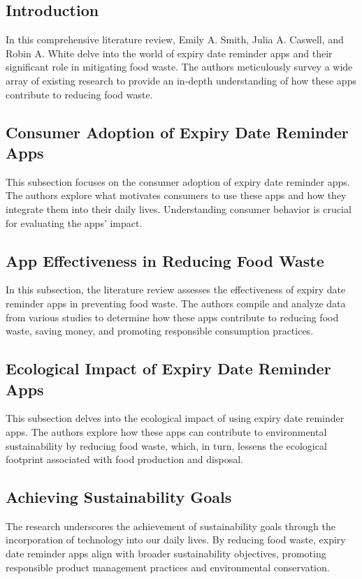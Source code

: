 \subsection{Introduction}
In this comprehensive literature review, Emily A. Smith, Julia A. Caswell, and Robin A. White delve into the world of expiry date reminder apps and their significant role in mitigating food waste. The authors meticulously survey a wide array of existing research to provide an in-depth understanding of how these apps contribute to reducing food waste.

\subsection{Consumer Adoption of Expiry Date Reminder Apps}
This subsection focuses on the consumer adoption of expiry date reminder apps. The authors explore what motivates consumers to use these apps and how they integrate them into their daily lives. Understanding consumer behavior is crucial for evaluating the apps' impact.

\subsection{App Effectiveness in Reducing Food Waste}
In this subsection, the literature review assesses the effectiveness of expiry date reminder apps in preventing food waste. The authors compile and analyze data from various studies to determine how these apps contribute to reducing food waste, saving money, and promoting responsible consumption practices.

\subsection{Ecological Impact of Expiry Date Reminder Apps}
This subsection delves into the ecological impact of using expiry date reminder apps. The authors explore how these apps can contribute to environmental sustainability by reducing food waste, which, in turn, lessens the ecological footprint associated with food production and disposal.

\subsection{Achieving Sustainability Goals}
The research underscores the achievement of sustainability goals through the incorporation of technology into our daily lives. By reducing food waste, expiry date reminder apps align with broader sustainability objectives, promoting responsible product management practices and environmental conservation.


